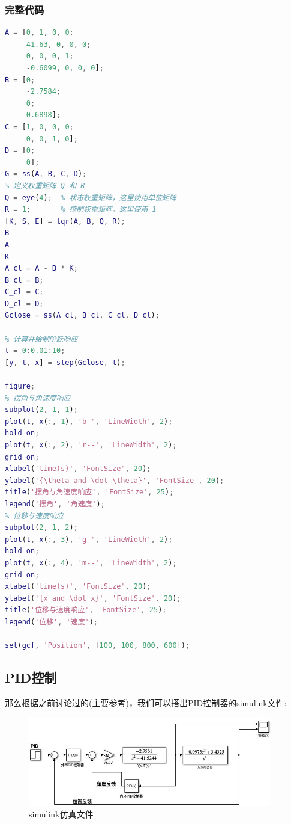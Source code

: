 \documentclass{article}
\begin{document}
\subsubsection*{完整代码}
\begin{lstlisting}[language=matlab,numbers=none]
% 定义状态矩阵 A 和控制矩阵 B 观测矩阵 C 和输入矩阵 D
A = [0, 1, 0, 0;
     41.63, 0, 0, 0;
     0, 0, 0, 1;
     -0.6099, 0, 0, 0];
B = [0;
     -2.7584;
     0;
     0.6898];
C = [1, 0, 0, 0;
     0, 0, 1, 0];
D = [0;
     0];
G = ss(A, B, C, D);
% 定义权重矩阵 Q 和 R
Q = eye(4);  % 状态权重矩阵，这里使用单位矩阵
R = 1;       % 控制权重矩阵，这里使用 1
[K, S, E] = lqr(A, B, Q, R);
B
A
K
A_cl = A - B * K;
B_cl = B;
C_cl = C;
D_cl = D;
Gclose = ss(A_cl, B_cl, C_cl, D_cl);

% 计算并绘制阶跃响应
t = 0:0.01:10;
[y, t, x] = step(Gclose, t);

figure;
% 摆角与角速度响应
subplot(2, 1, 1);
plot(t, x(:, 1), 'b-', 'LineWidth', 2);
hold on;
plot(t, x(:, 2), 'r--', 'LineWidth', 2);
grid on;
xlabel('time(s)', 'FontSize', 20);
ylabel('{\theta and \dot \theta}', 'FontSize', 20);
title('摆角与角速度响应', 'FontSize', 25);
legend('摆角', '角速度');
% 位移与速度响应
subplot(2, 1, 2);
plot(t, x(:, 3), 'g-', 'LineWidth', 2);
hold on;
plot(t, x(:, 4), 'm--', 'LineWidth', 2);
grid on;
xlabel('time(s)', 'FontSize', 20);
ylabel('{x and \dot x}', 'FontSize', 20);
title('位移与速度响应', 'FontSize', 25);
legend('位移', '速度');

set(gcf, 'Position', [100, 100, 800, 600]);
\end{lstlisting}
\subsection*{PID控制}
那么根据之前讨论过的(主要参考)，我们可以搭出PID控制器的simulink文件:
\begin{figure}[htbp]
    \centering
    \includegraphics[width=0.95\textwidth]{imgs/simulink_pid.png}
    \caption{simulink仿真文件}    
\end{figure}
\end{document}
